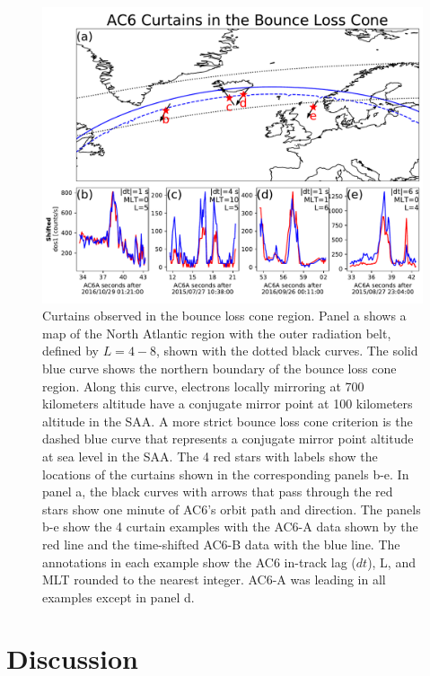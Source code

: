 \documentclass[draft]{agujournal2019}
\begin{document}
\begin{figure}
\includegraphics[width=\textwidth]{fig5.pdf}
\caption{Curtains observed in the bounce loss cone region. Panel a shows a map of the North Atlantic region with the outer radiation belt, defined by $L=4-8$, shown with the dotted black curves. The solid blue curve shows the northern boundary of the bounce loss cone region. Along this curve, electrons locally mirroring at 700 kilometers altitude have a conjugate mirror point at 100 kilometers altitude in the SAA. A more strict bounce loss cone criterion is the dashed blue curve that represents a conjugate mirror point altitude at sea level in the SAA. The 4 red stars with labels show the locations of the curtains shown in the corresponding panels b-e. In panel a, the black curves with arrows that pass through the red stars show one minute of AC6's orbit path and direction. The panels b-e show the 4 curtain examples with the AC6-A data shown by the red line and the time-shifted AC6-B data with the blue line. The annotations in each example show the AC6 in-track lag ($dt$), L, and MLT rounded to the nearest integer. AC6-A was leading in all examples except in panel d.}
\label{fig3}
\end{figure}

\section{Discussion} \label{discussion}
\end{document}
